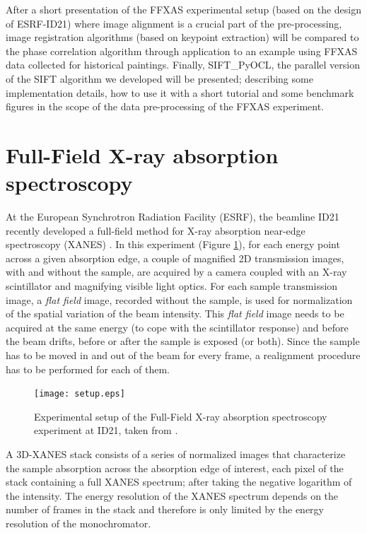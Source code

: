 \documentclass[preprint]{iucr}
\begin{document}
After a short presentation of the FFXAS
experimental setup (based on the design of ESRF-ID21) where image alignment is a
crucial part of the pre-processing, image registration algorithms (based on
keypoint extraction) will
be compared to the phase correlation algorithm through application to an example
using FFXAS data collected for historical paintings.
Finally, SIFT\_PyOCL, the parallel version of the SIFT algorithm we developed
will be presented; describing some implementation details, how to use it
with a short tutorial and some benchmark figures in the scope of the data
pre-processing of the FFXAS experiment.

\section{Full-Field X-ray absorption spectroscopy}
At the European Synchrotron Radiation Facility (ESRF), the beamline ID21
recently developed a full-field method for X-ray absorption near-edge
spectroscopy (XANES) \cite{andrade,fullfield}.
In this experiment (Figure \ref{setup}), for each energy point across a given
absorption edge, a couple of magnified 2D transmission images, with and
without the sample, are acquired by a camera coupled with an
X-ray scintillator and magnifying visible light optics.
For each sample transmission image, a \emph{flat field} image,
recorded without the sample, is used for normalization of the spatial
variation of the beam intensity.
This \emph{flat field} image needs to be acquired at the same energy (to cope
with the scintillator response) and before the beam drifts, before or
after the sample is exposed (or both).
Since the sample has to be moved in and out of the beam for every frame, a
realignment procedure has to be performed for each of them.

\begin{figure}
\label{setup}
\begin{center}
\texttt{[image: setup.eps]}
\caption{Experimental setup of the Full-Field X-ray absorption
spectroscopy experiment at ID21, taken from \cite{fullfield}.}
\end{center}
\end{figure}

A 3D-XANES stack consists of a series of normalized images that
characterize the sample absorption across the absorption edge of interest, each pixel of the
stack containing a full XANES spectrum; after taking the negative logarithm
of the intensity.
The energy resolution of the XANES spectrum depends on the number of frames in
the stack and therefore is only limited by the energy resolution of the monochromator.
\end{document}
